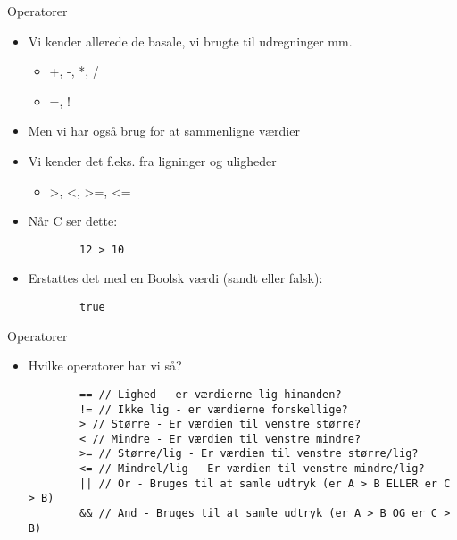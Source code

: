 \documentclass{beamer}
\begin{document}
\begin{frame}[fragile]{Operatorer}
	\begin{itemize}
		\item{Vi kender allerede de basale, vi brugte til udregninger mm.}
		\begin{itemize}
			\item{{\color{dkgreen}+}, {\color{dkgreen}-}, {\color{dkgreen}*}, {\color{dkgreen}/}}
			\item{{\color{dkgreen}=}, {\color{dkgreen}!}}
		\end{itemize}
		\item{Men vi har også brug for at sammenligne værdier}
		\item{Vi kender det f.eks. fra ligninger og uligheder}
		\begin{itemize}
			\item{{\color{dkgreen}>}, {\color{dkgreen}<}, {\color{dkgreen}>=}, {\color{dkgreen}<=}}
		\end{itemize}
		\item{Når C ser dette:}
		\begin{lstlisting}
		12 > 10
		\end{lstlisting}
		\item{Erstattes det med en Boolsk værdi (sandt eller falsk):}
		\begin{lstlisting}
		true
		\end{lstlisting}
	\end{itemize}
\end{frame}


\begin{frame}[fragile]{Operatorer}
	\begin{itemize}
		\item{Hvilke operatorer har vi så?}
		\begin{lstlisting}
		== // Lighed - er værdierne lig hinanden?
		!= // Ikke lig - er værdierne forskellige?
		> // Større - Er værdien til venstre større?
		< // Mindre - Er værdien til venstre mindre?
		>= // Større/lig - Er værdien til venstre større/lig?
		<= // Mindrel/lig - Er værdien til venstre mindre/lig?
		|| // Or - Bruges til at samle udtryk (er A > B ELLER er C > B)
		&& // And - Bruges til at samle udtryk (er A > B OG er C > B)
		\end{lstlisting}
	\end{itemize}
\end{frame}
\end{document}
